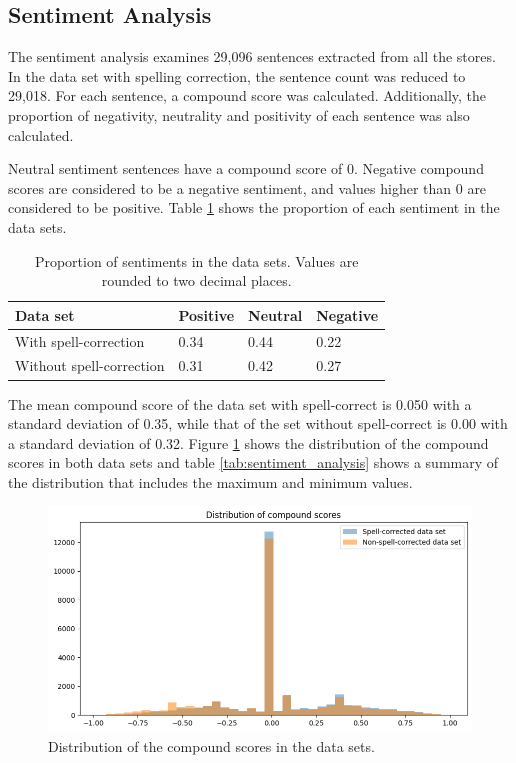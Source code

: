 \subsection{Sentiment Analysis}

The sentiment analysis examines 29,096 sentences extracted from all the stores. In the data set with spelling correction, the sentence count was reduced to 29,018. For each sentence, a compound score was calculated. Additionally, the proportion of negativity, neutrality and positivity of each sentence was also calculated.

Neutral sentiment sentences have a compound score of 0. Negative compound scores are considered to be a negative sentiment, and values higher than 0 are considered to be positive. Table \ref{tab:sentiment_proportion} shows the proportion of each sentiment in the data sets.

\begin{table}
    \centering
    \begin{tabular}{llll}
        \hline
        Data set & Positive & Neutral & Negative \\ \hline
        With spell-correction & 0.34 & 0.44 & 0.22 \\
        Without spell-correction & 0.31 & 0.42 & 0.27 \\
        \hline
    \end{tabular}
    \caption{Proportion of sentiments in the data sets. Values are rounded to two decimal places.}
    \label{tab:sentiment_proportion}
\end{table}

The mean compound score of the data set with spell-correct is 0.050 with a standard deviation of 0.35, while that of the set without spell-correct is 0.00 with a standard deviation of 0.32. Figure \ref{fig:sentiment_distribution} shows the distribution of the compound scores in both data sets and table \ref{tab:sentiment_analysis} shows a summary of the distribution that includes the maximum and minimum values.

\begin{figure}[H]
    \centering
    \includegraphics[width=\textwidth]{resources/compound_scores.png}
    \caption{Distribution of the compound scores in the data sets.}
    \label{fig:sentiment_distribution}
\end{figure}

